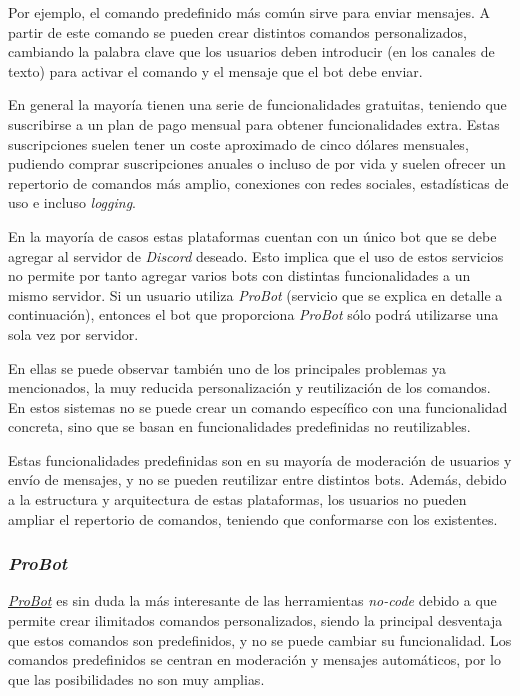 Por ejemplo, el comando predefinido más común sirve para enviar mensajes. A partir de este comando se pueden crear distintos comandos personalizados, cambiando la palabra clave que los usuarios deben introducir (en los canales de texto) para activar el comando y el mensaje que el bot debe enviar.

En general la mayoría tienen una serie de funcionalidades gratuitas, teniendo que suscribirse a un plan de pago mensual para obtener funcionalidades extra. Estas suscripciones suelen tener un coste aproximado de cinco dólares mensuales, pudiendo comprar suscripciones anuales o incluso de por vida y suelen ofrecer un repertorio de comandos más amplio, conexiones con redes sociales, estadísticas de uso e incluso \textit{logging}.

En la mayoría de casos estas plataformas cuentan con un único bot que se debe agregar al servidor de \textit{Discord} deseado. Esto implica que el uso de estos servicios no permite por tanto agregar varios bots con distintas funcionalidades a un mismo servidor. Si un usuario utiliza \textit{ProBot} (servicio que se explica en detalle a continuación), entonces el bot que proporciona \textit{ProBot} sólo podrá utilizarse una sola vez por servidor.

En ellas se puede observar también uno de los principales problemas ya mencionados, la muy reducida personalización y reutilización de los comandos. En estos sistemas no se puede crear un comando específico con una funcionalidad concreta, sino que se basan en funcionalidades predefinidas no reutilizables.

Estas funcionalidades predefinidas son en su mayoría de moderación de usuarios y envío de mensajes, y no se pueden reutilizar entre distintos bots. Además, debido a la estructura y arquitectura de estas plataformas, los usuarios no pueden ampliar el repertorio de comandos, teniendo que conformarse con los existentes.

\subsubsection{\textit{ProBot}}

\href{https://probot.io/}{\textit{ProBot}} es sin duda la más interesante de las herramientas \textit{no-code} debido a que permite crear ilimitados comandos personalizados, siendo la principal desventaja que estos comandos son predefinidos, y no se puede cambiar su funcionalidad. Los comandos predefinidos se centran en moderación y mensajes automáticos, por lo que las posibilidades no son muy amplias.

